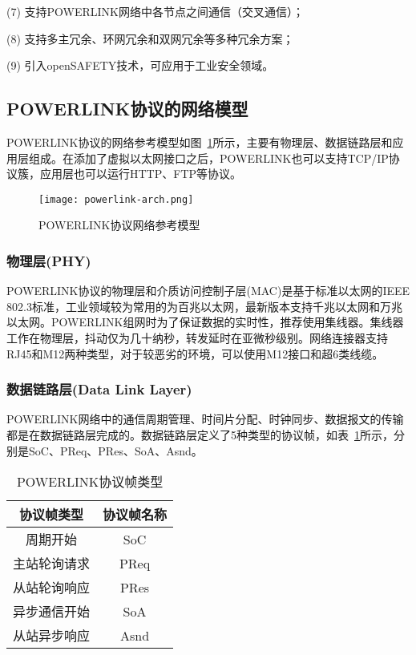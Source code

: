 (7) 支持POWERLINK网络中各节点之间通信（交叉通信）；

(8) 支持多主冗余、环网冗余和双网冗余等多种冗余方案；

(9) 引入openSAFETY技术，可应用于工业安全领域。

\subsection{POWERLINK协议的网络模型}
\label{subsection:POWERLINK协议的网络模型}

POWERLINK协议的网络参考模型如图~\ref{fig:powerlink-arch}所示，主要有物理层、数据链路层和应用层组成。在添加了虚拟以太网接口之后，POWERLINK也可以支持TCP/IP协议簇，应用层也可以运行HTTP、FTP等协议。

\begin{figure}[!htb]
  \centering
  \texttt{[image: powerlink-arch.png]}
  \caption{POWERLINK协议网络参考模型}
  \label{fig:powerlink-arch}
\end{figure}

\subsubsection{物理层(PHY)}

POWERLINK协议的物理层和介质访问控制子层(MAC)是基于标准以太网的IEEE 802.3标准，工业领域较为常用的为百兆以太网，最新版本支持千兆以太网和万兆以太网。POWERLINK组网时为了保证数据的实时性，推荐使用集线器。集线器工作在物理层，抖动仅为几十纳秒，转发延时在亚微秒级别。网络连接器支持RJ45和M12两种类型，对于较恶劣的环境，可以使用M12接口和超6类线缆。

\subsubsection{数据链路层(Data Link Layer)}

POWERLINK网络中的通信周期管理、时间片分配、时钟同步、数据报文的传输都是在数据链路层完成的。数据链路层定义了5种类型的协议帧，如表~\ref{table:2.2}所示，分别是SoC、PReq、PRes、SoA、Asnd。

\begin{table}[hbt]
  \centering
  \caption{POWERLINK协议帧类型}
  \label{table:2.2}
  \setlength{\tabcolsep}{15mm}
  \begin{tabular}{cc}
    \toprule

     协议帧类型 & 协议帧名称\\
    \midrule
    周期开始 & SoC\\
    
    主站轮询请求 & PReq\\
    
    从站轮询响应 & PRes\\
    
    异步通信开始  & SoA\\
    
    从站异步响应  & Asnd\\              
    \bottomrule
  \end{tabular}

\end{table}

